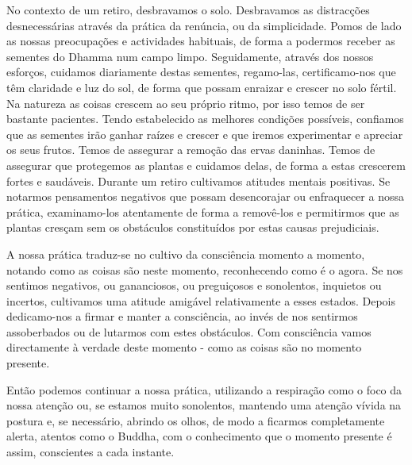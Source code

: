 No contexto de um retiro, desbravamos o solo. Desbravamos as distracções
desnecessárias através da prática da renúncia, ou da simplicidade. Pomos
de lado as nossas preocupações e actividades habituais, de forma a
podermos receber as sementes do Dhamma num campo limpo. Seguidamente,
através dos nossos esforços, cuidamos diariamente destas sementes,
regamo-las, certificamo-nos que têm claridade e luz do sol, de forma que
possam enraizar e crescer no solo fértil. Na natureza as coisas crescem
ao seu próprio ritmo, por isso temos de ser bastante pacientes. Tendo
estabelecido as melhores condições possíveis, confiamos que as sementes
irão ganhar raízes e crescer e que iremos experimentar e apreciar os
seus frutos. Temos de assegurar a remoção das ervas daninhas. Temos de
assegurar que protegemos as plantas e cuidamos delas, de forma a estas
crescerem fortes e saudáveis. Durante um retiro cultivamos atitudes
mentais positivas. Se notarmos pensamentos negativos que possam
desencorajar ou enfraquecer a nossa prática, examinamo-los atentamente
de forma a removê-los e permitirmos que as plantas cresçam sem os
obstáculos constituídos por estas causas prejudiciais.

A nossa prática traduz-se no cultivo da consciência momento a momento,
notando como as coisas são neste momento, reconhecendo como é o agora.
Se nos sentimos negativos, ou gananciosos, ou preguiçosos e sonolentos,
inquietos ou incertos, cultivamos uma atitude amigável relativamente a
esses estados. Depois dedicamo-nos a firmar e manter a consciência, ao
invés de nos sentirmos assoberbados ou de lutarmos com estes obstáculos.
Com consciência vamos directamente à verdade deste momento - como as
coisas são no momento presente.

Então podemos continuar a nossa prática, utilizando a respiração como o
foco da nossa atenção ou, se estamos muito sonolentos, mantendo uma
atenção vívida na postura e, se necessário, abrindo os olhos, de modo a
ficarmos completamente alerta, atentos como o Buddha, com o conhecimento
que o momento presente é assim, conscientes a cada instante.

